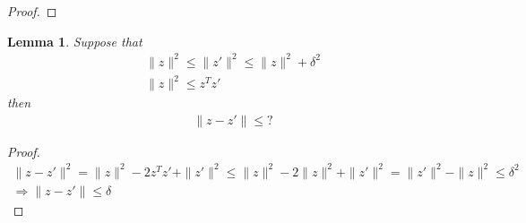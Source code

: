 \documentclass{article}
\newtheorem{lemma}[theorem]{Lemma}
\theoremstyle{case}
\numberwithin{theorem}{subsection}
\newcommand{\reals}{\mathbb R}
\newcommand{\Rn}{\mathbb R^n}
\begin{document}
\begin{proof}
% 
% 
% 
% 
% 
% 
% 
% 
\end{proof}









\begin{lemma}
Suppose that 
\begin{align*}
\|z \|^2 \le \|z'\|^2 \le \|z \|^2 + \delta^2 \\
\|z\|^2 \le {z}^Tz'
\end{align*}
then
\begin{align*}
\|z - z'\| \le ?
\end{align*}
\end{lemma}
\begin{proof}
\begin{align*}
\|z - z'\|^2 
= \|z\|^2 - 2 z^Tz' + \|z'\|^2 
\le \|z\|^2 - 2 \|z\|^2 + \|z'\|^2 = \|z'\|^2 - \|z\|^2
\le \delta^2 \\
\Longrightarrow \|z - z'\| \le \delta
\end{align*}
\end{proof}
\end{document}
